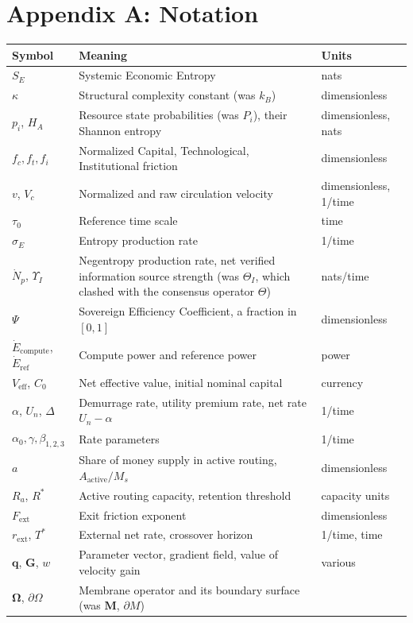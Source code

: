 \documentclass[11pt,a4paper]{article}
\theoremstyle{definition}
\theoremstyle{plain}
\theoremstyle{remark}
\newcommand{\Edot}{\dot E_{\mathrm{compute}}}
\newcommand{\Eref}{\dot E_{\mathrm{ref}}}
\begin{document}
\section*{Appendix A: Notation}
\begin{longtable}{@{}p{2.8cm}p{9.2cm}p{3.2cm}@{}}
\toprule
Symbol & Meaning & Units \\
\midrule
\endhead
$S_E$ & Systemic Economic Entropy & nats \\
$\kappa$ & Structural complexity constant (was $k_B$) & dimensionless \\
$p_i$, $H_A$ & Resource state probabilities (was $P_i$), their Shannon entropy & dimensionless, nats \\
$f_c, f_t, f_i$ & Normalized Capital, Technological, Institutional friction & dimensionless \\
$v$, $V_c$ & Normalized and raw circulation velocity & dimensionless, 1/time \\
$\tau_0$ & Reference time scale & time \\
$\sigma_E$ & Entropy production rate & 1/time \\
$\dot N_p$, $\Upsilon_I$ & Negentropy production rate, net verified information source strength (was $\Theta_I$, which clashed with the consensus operator $\Theta$) & nats/time \\
$\Psi$ & Sovereign Efficiency Coefficient, a fraction in $[0,1]$ & dimensionless \\
$\Edot$, $\Eref$ & Compute power and reference power & power \\
$V_{\mathrm{eff}}$, $C_0$ & Net effective value, initial nominal capital & currency \\
$\alpha$, $U_n$, $\Delta$ & Demurrage rate, utility premium rate, net rate $U_n - \alpha$ & 1/time \\
$\alpha_0, \gamma, \beta_{1,2,3}$ & Rate parameters & 1/time \\
$a$ & Share of money supply in active routing, $A_{\mathrm{active}}/M_s$ & dimensionless \\
$R_a$, $R^{*}$ & Active routing capacity, retention threshold & capacity units \\
$F_{\mathrm{ext}}$ & Exit friction exponent & dimensionless \\
$r_{\mathrm{ext}}$, $T^{*}$ & External net rate, crossover horizon & 1/time, time \\
$\mathbf q$, $\mathbf G$, $w$ & Parameter vector, gradient field, value of velocity gain & various \\
$\boldsymbol\Omega$, $\partial\Omega$ & Membrane operator and its boundary surface (was $\mathbf M$, $\partial M$) & \\

\end{longtable}
\end{document}
